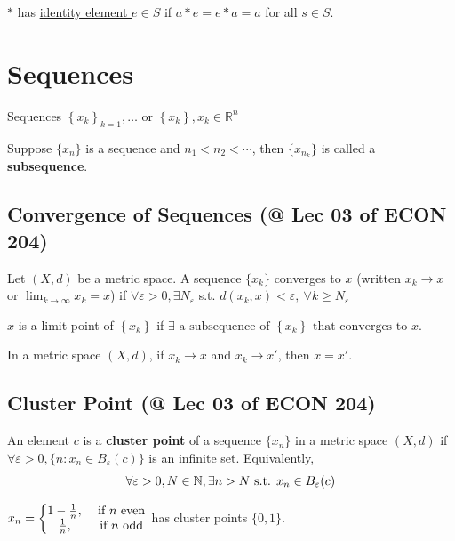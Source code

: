 \documentclass[11pt]{elegantbook}
\begin{document}
\begin{definition}
$*$ has \underline{identity element $e\in S$} if $a*e=e*a=a$ for all $s\in S$.
\end{definition}



\section{Sequences}
Sequences $\left\{x_{k}\right\}_{k=1}, \ldots$ or $\left\{x_{k}\right\}, x_{k} \in \mathbb{R}^{n}$

\begin{definition}[Subsequence]
\normalfont
    Suppose $\{x_n\}$ is a sequence and $n_1<n_2<\cdots$, then $\{x_{n_k}\}$ is called a \textbf{subsequence}.
\end{definition}

\subsection{Convergence of Sequences \small{(@ Lec 03 of ECON 204)}}
\begin{definition}[Convergence: note $x_{k} \rightarrow x, \lim _{k \rightarrow \infty} x_{k}=x$]
    Let $(X, d)$ be a metric space. A sequence $\{x_k\}$ converges to $x$ (written $x_{k} \rightarrow x$ or $\lim _{k \rightarrow \infty} x_{k}=x$) if $\forall \varepsilon>0, \exists N_{\varepsilon}$ s.t. $d(x_{k},x)<\varepsilon,\ \forall k \geqslant N_{\varepsilon}$
\end{definition}

\begin{definition}
    $x$ is a limit point of $\left\{x_{k}\right\}$ if $\exists \text { a subsequence of }\left\{x_{k}\right\} \text { that converges to } x$.
    \end{definition}
\begin{theorem}
    In a metric space $(X, d)$, if $x_{k} \rightarrow x$ and $x_{k} \rightarrow x'$, then $x=x'$.
\end{theorem}

\subsection{Cluster Point \small{(@ Lec 03 of ECON 204)}}
\begin{definition}
\normalfont
    An element $c$ is a \textbf{cluster point} of a sequence $\{x_n\}$ in a metric space $(X, d)$ if $\forall\varepsilon > 0, \{n : x_n \in B_\varepsilon(c)\}$ is an infinite set. Equivalently, $$\forall\varepsilon > 0, N\in \mathbb{N}, \exists n>N \textnormal{ s.t. } x_n \in B_\varepsilon(c)$$
\end{definition}
\begin{example}
    $x_n=\left\{\begin{matrix}
        1-\frac{1}{n},& \textnormal{ if $n$ even}\\
        \frac{1}{n},&\textnormal{ if $n$ odd}
    \end{matrix}\right.$ has cluster points $\{0,1\}$.
\end{example}
\end{document}
